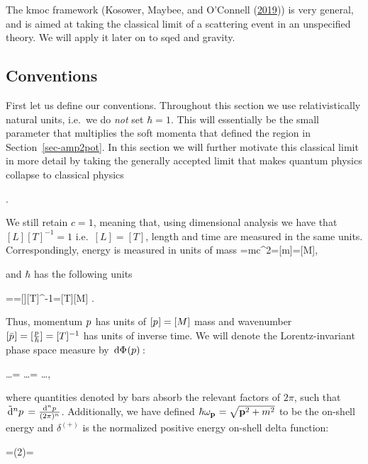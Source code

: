 \documentclass[
  11pt,
  a4paper,
  DIV=11,
  numbers=noendperiod,
  oneside]{scrreprt}
\let\[\relax \let\]\relax %
\DeclareRobustCommand{\[}{\begin{equation}}
\DeclareRobustCommand{\]}{\end{equation}}
\begin{document}
The \acrfull{kmoc} framework (Kosower, Maybee, and O'Connell
(\protect\hyperlink{ref-Kosower:2018adc}{2019})) is very general, and is
aimed at taking the classical limit of a scattering event in an
unspecified theory. We will apply it later on to \gls{sqed} and gravity.

\hypertarget{conventions}{%
\subsection{Conventions}\label{conventions}}

First let us define our conventions. Throughout this section we use
relativistically natural units, i.e.~we do \emph{not} set \(\hbar=1\).
This will essentially be the small parameter that multiplies the soft
momenta that defined the region in Section~\ref{sec-amp2pot}. In this
section we will further motivate this classical limit in more detail by
taking the generally accepted limit that makes quantum physics collapse
to classical physics

\[\hbar{}.\]

We still retain \(c=1\), meaning that, using dimensional analysis we
have that \([L][T]^{-1}=1\) i.e.~\([L]=[T]\), length and time are
measured in the same units. Correspondingly, energy is measured in units
of mass \[
\energy=mc^2\implies[\energy]=[m]=[M],
\]

and \(\hbar\) has the following units

\[
\energy=\hbar \omega\implies [M]=[\hbar][T]^{-1}\implies [\hbar]=[T][M]
.\]

Thus, momentum \(\emom\) has units of \([\emom]=[M]\) mass and
wavenumber \([\bar{\emom}]=[\frac{\emom}{\hbar}]=[T]^{-1}\) has units of
inverse time. We will denote the Lorentz-invariant phase space measure
by \(\ddP{p}\):

\[
\int {} \dots      = \int {} \dots = \int {} \dots,
\]

where quantities denoted by bars absorb the relevant factors of
\(2\pi\), such that \(\dn[n]{p}=\frac{\dd[n]p}{(2\pi)^n}\).
Additionally, we have defined \(\hbar\shellen=\sqrt{\tv{p}^2+m^2}\) to
be the on-shell energy and \(\delta^{(+)}\) is the normalized positive
energy on-shell delta function:

\[
=(2\pi)=
\]
\end{document}
